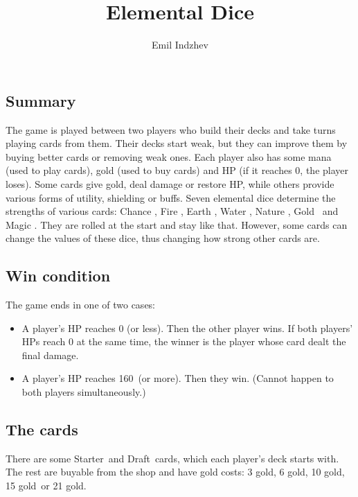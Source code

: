 \documentclass[dvipsnames,parskip,a4paper]{scrartcl}
\date{}
\title{Elemental Dice}
\author{Emil Indzhev}
\newcommand{\iconsize}{3.4mm}
\newcommand{\icondepth}{0.45mm}
\newcommand{\icon}[1]{\raisebox{-\icondepth}{\texttt{[image:  \#1 ]}}}
\newcommand{\chance}{\icon{icons/chance.png}}
\newcommand{\fire}{\icon{icons/fire.png}}
\newcommand{\earth}{\icon{icons/earth.png}}
\newcommand{\water}{\icon{icons/water.png}}
\newcommand{\nature}{\icon{icons/nature.png}}
\newcommand{\magic}{\icon{icons/magic.png}}
\newcommand{\gold}{\icon{icons/gold.png}}
\newcommand{\starter}{Starter}
\newcommand{\draft}{Draft}
\newcommand{\onecost}{3 gold}
\newcommand{\twocost}{6 gold}
\newcommand{\threecost}{10 gold}
\newcommand{\fourcost}{15 gold}
\newcommand{\fivecost}{21 gold}
\newcommand{\maxhp}{160}
\begin{document}
\maketitle

\newpage

\subsection*{Summary}

The game is played between two players who build their decks and take turns playing cards from them. Their decks start weak, but they can improve them by buying better cards or removing weak ones. Each player also has some mana (used to play cards), gold (used to buy cards) and HP (if it reaches 0, the player loses). Some cards give gold, deal damage or restore HP, while others provide various forms of utility, shielding or buffs. Seven elemental dice determine the strengths of various cards: Chance \chance, Fire \fire, Earth \earth, Water \water, Nature \nature, Gold \gold \ and Magic \magic. They are rolled at the start and stay like that. However, some cards can change the values of these dice, thus changing how strong other cards are.

\subsection*{Win condition}

The game ends in one of two cases:

\begin{itemize}
\item A player's HP reaches 0 (or less). Then the other player wins. If both players' HPs reach 0 at the same time, the winner is the player whose card dealt the final damage.
\item A player's HP reaches \maxhp \ (or more). Then they win. (Cannot happen to both players simultaneously.)
\end{itemize}

\subsection*{The cards}

There are some \starter \ and \draft \ cards, which each player's deck starts with. The rest are buyable from the shop and have gold costs: \onecost, \twocost, \threecost, \fourcost \ or \fivecost.

\vspace{4pt}
\end{document}
